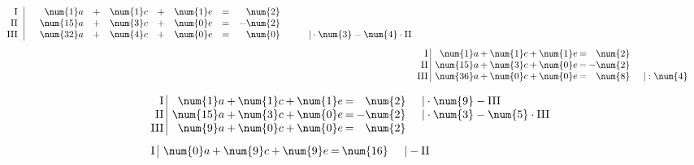 \begin{exercise}
\begin{minipage}[t]{0.49\linewidth}
\begin{alignat*}{1}
\begin{array}{r|rrrrrrrrrl}
          \text{I}{\,} & {\,} &  \num{1}a & + & \num{1}c & + & \num{1}e & = &  \num{2} & {\quad} &                                     \\
         \text{II}{\,} & {\,} & \num{15}a & + & \num{3}c & + & \num{0}e & = & -\num{2} & {\quad} &                                     \\
        \text{III}{\,} & {\,} & \num{32}a & + & \num{4}c & + & \num{0}e & = &  \num{0} & {\quad} & |\cdot\num{3}-\num{4}\cdot\text{II}
        \end{array}
        \\[1ex]&\setlength{\arraycolsep}{0.1em}%
        \begin{array}{r|rrrrrrrrrl}
          \text{I}{\,} & {\,} &  \num{1}a & + & \num{1}c & + & \num{1}e & = &  \num{2} & {\quad} &           \\
         \text{II}{\,} & {\,} & \num{15}a & + & \num{3}c & + & \num{0}e & = & -\num{2} & {\quad} &           \\
        \text{III}{\,} & {\,} & \num{36}a & + & \num{0}c & + & \num{0}e & = &  \num{8} & {\quad} & |:\num{4}
        \end{array}
      \end{alignat*}
    \end{minipage}%
    \hfill
    \begin{minipage}[t]{0.49\linewidth}
      \vspace*{-\abovedisplayskip}
      \begin{alignat*}{1}
        &\setlength{\arraycolsep}{0.1em}%
        \begin{array}{r|rrrrrrrrrl}
          \text{I}{\,} & {\,} &  \num{1}a & + & \num{1}c & + & \num{1}e & = &  \num{2} & {\quad} & |\cdot\num{9}-\text{III}             \\
         \text{II}{\,} & {\,} & \num{15}a & + & \num{3}c & + & \num{0}e & = & -\num{2} & {\quad} & |\cdot\num{3}-\num{5}\cdot\text{III} \\
        \text{III}{\,} & {\,} &  \num{9}a & + & \num{0}c & + & \num{0}e & = &  \num{2} & {\quad} &
        \end{array}
        \\[1ex]&\setlength{\arraycolsep}{0.1em}%
        \begin{array}{r|rrrrrrrrrl}
          \text{I}{\,} & {\,} & \num{0}a & + & \num{9}c & + & \num{9}e & = &  \num{16} & {\quad} & |-\text{II} \\

\end{array}
\end{alignat*}
\end{minipage}
\end{exercise}
